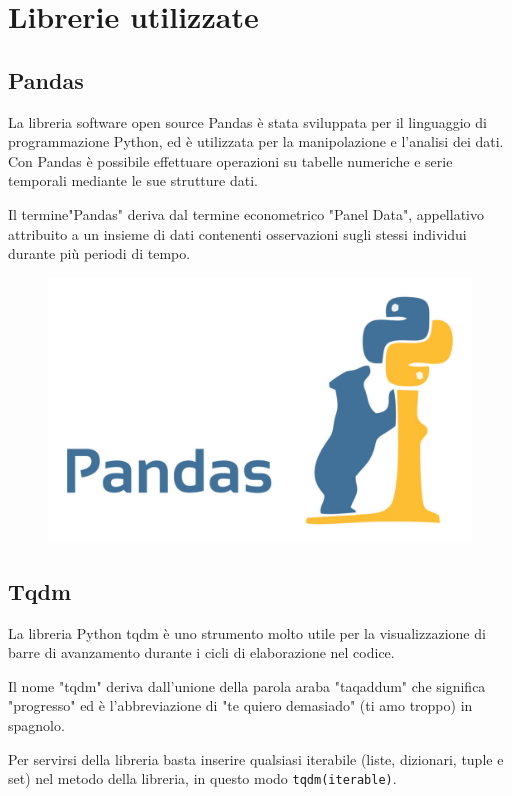 \section{Librerie utilizzate}
\subsection{Pandas}
La libreria software open source Pandas è stata sviluppata per il linguaggio di programmazione Python, ed è utilizzata per la manipolazione e l'analisi dei dati. Con Pandas è possibile effettuare operazioni su tabelle numeriche e serie temporali mediante le sue strutture dati. 

Il termine"Pandas" deriva dal termine econometrico "Panel Data", appellativo attribuito a un insieme di dati contenenti osservazioni sugli stessi individui durante più periodi di tempo.

\begin{figure}
    \begin{center}    
        \includegraphics[width=0.9\linewidth]{images/image4.jpeg}
    \end{center}
\end{figure}

\subsection{Tqdm \cite{Tqdm}}
La libreria Python tqdm è uno strumento molto utile per la visualizzazione di barre di avanzamento durante i cicli di elaborazione nel codice. 

Il nome "tqdm" deriva dall'unione della parola araba "taqaddum" che significa "progresso" ed è l'abbreviazione di "te quiero demasiado" (ti amo troppo) in spagnolo. 

Per servirsi della libreria basta inserire qualsiasi iterabile (liste, dizionari, tuple e set) nel metodo della libreria, in questo modo \texttt{tqdm(iterable)}. 

